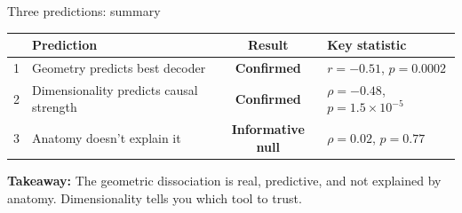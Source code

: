 \documentclass[aspectratio=169,11pt]{beamer}
\begin{document}
\begin{frame}{Three predictions: summary}

\begin{center}
{\small
\begin{tabular}{llcl}
\toprule
& \textbf{Prediction} & \textbf{Result} & \textbf{Key statistic} \\
\midrule
1 & Geometry predicts best decoder & \textcolor{pass}{\textbf{Confirmed}} & $r = -0.51$, $p = 0.0002$ \\[0.5em]
2 & Dimensionality predicts causal strength & \textcolor{pass}{\textbf{Confirmed}} & $\rho = -0.48$, $p = 1.5 \times 10^{-5}$ \\[0.5em]
3 & Anatomy doesn't explain it & \textcolor{pass}{\textbf{Informative null}} & $\rho = 0.02$, $p = 0.77$ \\
\bottomrule
\end{tabular}
}
\end{center}

\vspace{1em}

\textbf{Takeaway:} The geometric dissociation is real, predictive, and not explained by anatomy. Dimensionality tells you which tool to trust.

\end{frame}
\end{document}
